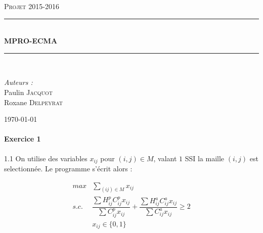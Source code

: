 \documentclass[12pt,a4paper]{article}
\newcommand{\reporttitle}{\vspace{3mm} MPRO-ECMA}
\newcommand{\reportauthor}{Paulin \textsc{Jacquot}\\Roxane \textsc{Delpeyrat}}
\newcommand{\reportsubject}{Projet 2015-2016}
\newcommand{\HRule}{\rule{\linewidth}{0.5mm}}
\begin{document}
\begin{titlepage}
	\begin{center}
		\begin{minipage}[c]{0.50\textwidth}
			\begin{flushright}
			\end{flushright}
		\end{minipage}
		\hfill
		\begin{minipage}[c]{0.50\textwidth}
			\begin{flushleft}
			\end{flushleft}
		\end{minipage}
		
		\vspace{2cm}
		
		\textsc{\Large \reportsubject}\\[0.5cm]
		\HRule \\[0.4cm]
		{\huge \bfseries \reporttitle}\\[0.4cm]
		\HRule \\[1.5cm]
		\begin{minipage}[t]{0.35\textwidth}
			\begin{flushleft} \large
				\emph{Auteurs :}\\
					\reportauthor
			\end{flushleft}
		\end{minipage}
		\vfill
		{\large \today}
	\end{center}
\end{titlepage}


\paragraph{Exercice 1\\}

1.1 On utilise des variables $x_{ij}$ pour $(i,j) \in M $, valant $1$ SSI la maille $(i,j)$ est selectionnée. Le programme s'écrit alors :

\begin{align}
\label{obj} max & \sum_{(ij)\in M} x_{ij} \\
s.c. \label{critere} \ & \dfrac{\sum H_{ij}^pC_{ij}^p x_{ij}}{\sum C_{ij}^p x_{ij}}+ \dfrac{\sum H_{ij}^a C_{ij}^a x_{ij}}{\sum C_{ij}^a x_{ij}}\geq 2 \\
& x_{ij}\in \{0,1\}
\end{align}
\end{document}
